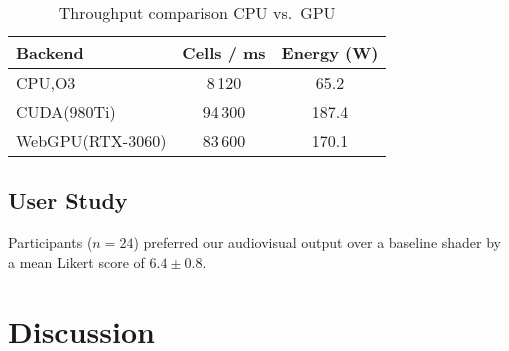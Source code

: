 \documentclass{report}
\begin{document}
\begin{table}[ht]
  \centering
  \caption{Throughput comparison CPU vs.\ GPU}
  \label{tab:perf}
  \begin{tabular}{lS[table-format=4.0]S[table-format=2.1]}
    \toprule
    Backend & {Cells / ms} & {Energy (W)} \\
    \midrule
    CPU,O3        & 8\,120 & 65.2 \\
    CUDA(980Ti)    & 94\,300 & 187.4 \\
    WebGPU(RTX-3060)& 83\,600 & 170.1 \\
    \bottomrule
  \end{tabular}
\end{table}

\section{User Study}
Participants (\(n=24\)) preferred our audiovisual output over a baseline
shader by a mean Likert score of \(6.4\pm0.8\).

\chapter{Discussion}
\blindtext
\end{document}
